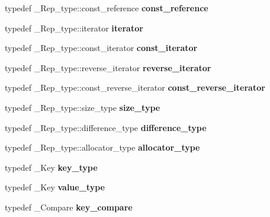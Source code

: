 \begin{DoxyCompactItemize}
\mbox{\label{classset_aeadfb8f3d17bdaf31de9df56fee94771}} 
typedef \+\_\+\+Rep\+\_\+type\+::const\+\_\+reference {\bfseries const\+\_\+reference}
\item 
\mbox{\label{classset_af9fae4fff076eb8d8abfed877d5f0e71}} 
typedef \+\_\+\+Rep\+\_\+type\+::iterator {\bfseries iterator}
\item 
\mbox{\label{classset_ada91ad8cba8b7e1baf539b6563657808}} 
typedef \+\_\+\+Rep\+\_\+type\+::const\+\_\+iterator {\bfseries const\+\_\+iterator}
\item 
\mbox{\label{classset_a1dc57983a390f9df10a210bffe7e1e43}} 
typedef \+\_\+\+Rep\+\_\+type\+::reverse\+\_\+iterator {\bfseries reverse\+\_\+iterator}
\item 
\mbox{\label{classset_aad905bc0a4dcc2770bc724caef015d28}} 
typedef \+\_\+\+Rep\+\_\+type\+::const\+\_\+reverse\+\_\+iterator {\bfseries const\+\_\+reverse\+\_\+iterator}
\item 
\mbox{\label{classset_a766ec186a8ed75e45976849a7a12079c}} 
typedef \+\_\+\+Rep\+\_\+type\+::size\+\_\+type {\bfseries size\+\_\+type}
\item 
\mbox{\label{classset_a7f3b10d3e2e6956acf71994eff3a3504}} 
typedef \+\_\+\+Rep\+\_\+type\+::difference\+\_\+type {\bfseries difference\+\_\+type}
\item 
\mbox{\label{classset_ac1d0dd27f14871579a8adcd3b73b87ef}} 
typedef \+\_\+\+Rep\+\_\+type\+::allocator\+\_\+type {\bfseries allocator\+\_\+type}
\item 
\mbox{\label{classset_a18806069795b803c921f2b726e5f6802}} 
typedef \+\_\+\+Key {\bfseries key\+\_\+type}
\item 
\mbox{\label{classset_adea299ad33dd6d0f09ba6c447dd10381}} 
typedef \+\_\+\+Key {\bfseries value\+\_\+type}
\item 
\mbox{\label{classset_aed96b2f2364a0612df3a63fd0a7e3ef0}} 
typedef \+\_\+\+Compare {\bfseries key\+\_\+compare}
\item 

\end{DoxyCompactItemize}
